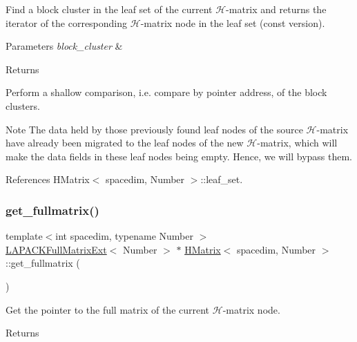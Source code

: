 Find a block cluster in the leaf set of the current $\mathcal{H}$-\/matrix and returns the iterator of the corresponding $\mathcal{H}$-\/matrix node in the leaf set (const version).


\begin{DoxyParams}{Parameters}
{\em block\+\_\+cluster} & \\
\hline
\end{DoxyParams}
\begin{DoxyReturn}{Returns}

\end{DoxyReturn}
Perform a shallow comparison, i.\+e. compare by pointer address, of the block clusters.


\begin{DoxyDescription}
\item[Note ]The data held by those previously found leaf nodes of the source $\mathcal{H}$-\/matrix have already been migrated to the leaf nodes of the new $\mathcal{H}$-\/matrix, which will make the data fields in these leaf nodes being empty. Hence, we will bypass them. 
\end{DoxyDescription}

References H\+Matrix$<$ spacedim, Number $>$\+::leaf\+\_\+set.

\mbox{\label{classHMatrix_a9d914c27d4e990d476a4529b2daa64cd}} 
\subsubsection{\texorpdfstring{get\+\_\+fullmatrix()}{get\_fullmatrix()}\hspace{0.1cm}{\footnotesize\ttfamily [1/2]}}
{\footnotesize\ttfamily template$<$int spacedim, typename Number $>$ \\
\hyperlink{classLAPACKFullMatrixExt}{L\+A\+P\+A\+C\+K\+Full\+Matrix\+Ext}$<$ Number $>$ $\ast$ \hyperlink{classHMatrix}{H\+Matrix}$<$ spacedim, Number $>$\+::get\+\_\+fullmatrix (\begin{DoxyParamCaption}{ }\end{DoxyParamCaption})}

Get the pointer to the full matrix of the current $\mathcal{H}$-\/matrix node. \begin{DoxyReturn}{Returns}

\end{DoxyReturn}


